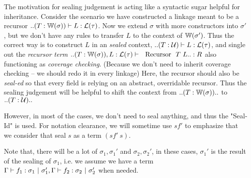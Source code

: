 The motivation for sealing judgement is acting like a syntactic sugar helpful for inheritance. Consider the scenario we have constructed a linkage meant to be a recursor $  .. (T : {\mathbb{W}}(\sigma)) \vdash L : {\mathcal{L}}(\tau)$. Now we extend $\sigma$ with more constructors into $\sigma'$, but we don't have any rules to transfer $L$ to the context of ${\mathbb{W}}(\sigma')$. Thus the correct way is to construct $L$ in an \textit{sealed} context, $  .. (T : {\mathcal{U}}) \vdash L : {\mathcal{L}}(\tau)$, and single out the \textit{recursor term}  $.. (T : \bW(\sigma)), L : \cL(\tau) \vdash \ \text{ Recursor } \ T \ L .. : R $ also functioning as \textit{coverage checking}.
(Because we don't need to inherit coverage checking -- we should redo it in every linkage) Here, the recursor should also be \textit{seal-ed} so that every field is relying on an abstract, overridable recursor.
Thus the sealing judgement will be helpful to shift the context from $.. (T : {\mathbb{W}}(\sigma)) .. $ to $.. (T : {\mathcal{U}}) ..$

However, in most of the cases, we don't need to seal anything, and thus the "Seal-Id" is used. For notation clearance, we will sometime use $sf'$ to emphasize that we consider that seal $s$ as a term $(sf' \ s)$. 


Note that, there will be a lot of $\sigma_1, \sigma_1'$ and $\sigma_2, \sigma_2'$, in these cases, $\sigma_1'$ is the result of the sealing of $\sigma_1$, i.e. we assume we have a term ${ {\Gamma} \vdash {f_1} : {\sigma_1} \ |\ {\sigma_1'} }, { {\Gamma} \vdash {f_2} : {\sigma_2} \ |\ {\sigma_2'} }$ when needed.


